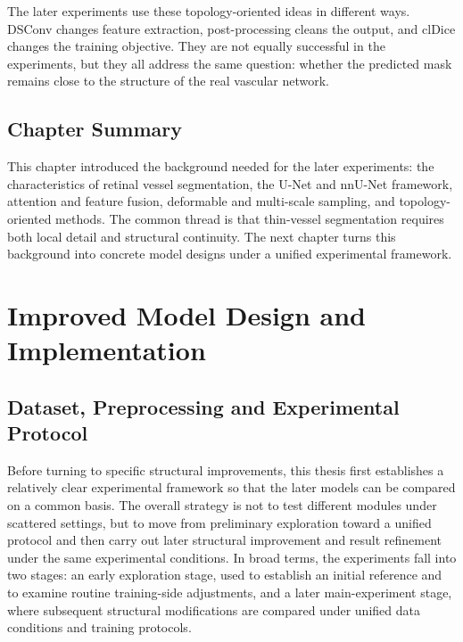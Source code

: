 \documentclass[a4paper,11pt]{article}
\begin{document}
The later experiments use these topology-oriented ideas in different ways. DSConv changes feature extraction, post-processing cleans the output, and clDice changes the training objective. They are not equally successful in the experiments, but they all address the same question: whether the predicted mask remains close to the structure of the real vascular network.

\subsection{Chapter Summary}
This chapter introduced the background needed for the later experiments: the characteristics of retinal vessel segmentation, the U-Net and nnU-Net framework, attention and feature fusion, deformable and multi-scale sampling, and topology-oriented methods. The common thread is that thin-vessel segmentation requires both local detail and structural continuity. The next chapter turns this background into concrete model designs under a unified experimental framework.

\section{Improved Model Design and Implementation}

\subsection{Dataset, Preprocessing and Experimental Protocol}
Before turning to specific structural improvements, this thesis first establishes a relatively clear experimental framework so that the later models can be compared on a common basis. The overall strategy is not to test different modules under scattered settings, but to move from preliminary exploration toward a unified protocol and then carry out later structural improvement and result refinement under the same experimental conditions. In broad terms, the experiments fall into two stages: an early exploration stage, used to establish an initial reference and to examine routine training-side adjustments, and a later main-experiment stage, where subsequent structural modifications are compared under unified data conditions and training protocols.
\end{document}
